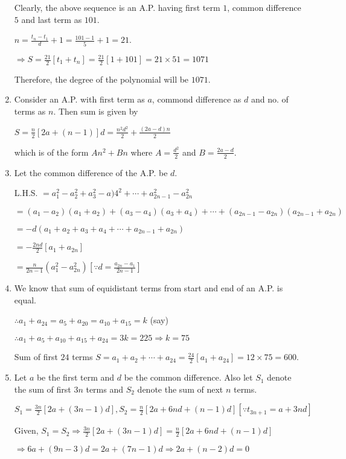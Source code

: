 \begin{enumerate}
  Clearly, the above sequence is an A.P. having first term $1$, common difference $5$ and last term as $101$.

  $n = \frac{t_n - t_1}{d} + 1 = \frac{101 - 1}{5} + 1 = 21$.

  $\Rightarrow S = \frac{21}{2}[t_1 + t_n] = \frac{21}{2}[1 + 101] = 21\times 51 = 1071$

  Therefore, the degree of the polynomial will be $1071$.
\item Consider an A.P. with first term as $a$, commond difference as $d$ and no. of terms as $n$. Then sum is given by

  $S = \frac{n}{2}[2a + (n - 1)]d = \frac{n^2d^2}{2} + \frac{(2a - d)n}{2}$

  which is of the form $An^2 + Bn$ where $A = \frac{d^2}{2}$ and $B = \frac{2a - d}{2}$.
\item Let the common difference of the A.P. be $d$.

  L.H.S. $= a_1^2 - a_2^2 + a_3^2 - a)4^2 + \cdots + a_{2n - 1}^2 -a_{2n}^2$

  $= (a_1 - a_2)(a_1 + a_2) + (a_3 - a_4)(a_3 + a_4) + \cdots + (a_{2n - 1} - a_{2n})(a_{2n - 1} + a_{2n})$

  $= -d(a_1 + a_2 + a_3 + a_4 + \cdots + a_{2n - 1} + a_{2n})$

  $= -\frac{2nd}{2}[a_1 + a_{2n}]$

  $= \frac{n}{2n - 1}(a_1^2 - a_{2n}^2)\left[\because d = \frac{a_{2n} - a_1}{2n - 1}\right]$
\item We know that sum of equidistant terms from start and end of an A.P. is equal.

  $\therefore a_1 + a_{24} = a_5 + a_{20} = a_{10} + a_{15} = k$ (say)

  $\therefore a_1 + a_5 + a_{10} + a_{15} + a_{24} = 3k = 225 \Rightarrow k = 75$

  Sum of first $24$ terms $S = a_1 + a_2 + \cdots + a_{24} = \frac{24}{2}[a_1 + a_{24}] = 12\times75 = 600$.
\item Let $a$ be the first term and $d$ be the common difference. Also let $S_1$ denote the sum of first $3n$ terms and $S_2$
  denote the sum of next $n$ terms.

  $S_1 = \frac{3n}{2}[2a + (3n - 1)d], S_2 = \frac{n}{2}[2a + 6nd + (n - 1)d][\because t_{3n+1} = a + 3nd]$

  Given, $S_1 = S_2 \Rightarrow \frac{3n}{2}[2a + (3n - 1)d] = \frac{n}{2}[2a + 6nd + (n - 1)d]$

  $\Rightarrow 6a + (9n - 3)d = 2a + (7n - 1)d \Rightarrow 2a + (n - 2)d = 0$


\end{enumerate}
